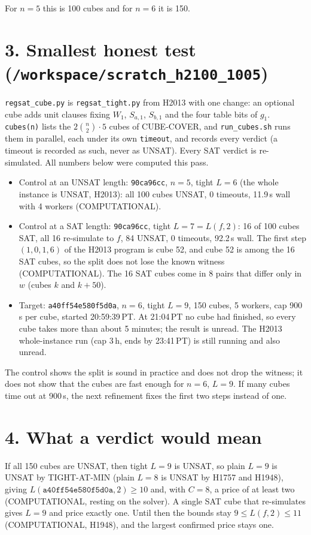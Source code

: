 \documentclass[11pt]{article}
\begin{document}
For $n=5$ this is 100 cubes and for $n=6$ it is 150.

\section*{3. Smallest honest test (\texttt{/workspace/scratch\_h2100\_1005})}
\texttt{regsat\_cube.py} is \texttt{regsat\_tight.py} from H2013 with one change: an optional cube adds unit clauses fixing $W_1$, $S_{a,1}$, $S_{b,1}$ and the four table bits of $g_1$. \texttt{cubes(n)} lists the $2\binom{n}{2}\cdot5$ cubes of CUBE-COVER, and \texttt{run\_cubes.sh} runs them in parallel, each under its own \texttt{timeout}, and records every verdict (a timeout is recorded as such, never as UNSAT). Every SAT verdict is re-simulated. All numbers below were computed this pass.
\begin{itemize}
\item Control at an UNSAT length: \texttt{90ca96cc}, $n=5$, tight $L=6$ (the whole instance is UNSAT, H2013): all 100 cubes UNSAT, 0 timeouts, 11.9\,s wall with 4 workers (COMPUTATIONAL).
\item Control at a SAT length: \texttt{90ca96cc}, tight $L=7=L(f,2)$: 16 of 100 cubes SAT, all 16 re-simulate to $f$, 84 UNSAT, 0 timeouts, 92.2\,s wall. The first step $(1,0,1,6)$ of the H2013 program is cube 52, and cube 52 is among the 16 SAT cubes, so the split does not lose the known witness (COMPUTATIONAL). The 16 SAT cubes come in 8 pairs that differ only in $w$ (cubes $k$ and $k+50$).
\item Target: \texttt{a40ff54e580f5d0a}, $n=6$, tight $L=9$, 150 cubes, 5 workers, cap 900\,s per cube, started 20:59:39\,PT. At 21:04\,PT no cube had finished, so every cube takes more than about 5 minutes; the result is unread. The H2013 whole-instance run (cap 3\,h, ends by 23:41\,PT) is still running and also unread.
\end{itemize}
The control shows the split is sound in practice and does not drop the witness; it does not show that the cubes are fast enough for $n=6$, $L=9$. If many cubes time out at 900\,s, the next refinement fixes the first two steps instead of one.

\section*{4. What a verdict would mean}
If all 150 cubes are UNSAT, then tight $L=9$ is UNSAT, so plain $L=9$ is UNSAT by TIGHT-AT-MIN (plain $L=8$ is UNSAT by H1757 and H1948), giving $L(\texttt{a40ff54e580f5d0a},2)\ge 10$ and, with $C=8$, a price of at least two (COMPUTATIONAL, resting on the solver). A single SAT cube that re-simulates gives $L=9$ and price exactly one. Until then the bounds stay $9\le L(f,2)\le 11$ (COMPUTATIONAL, H1948), and the largest confirmed price stays one.
\end{document}
